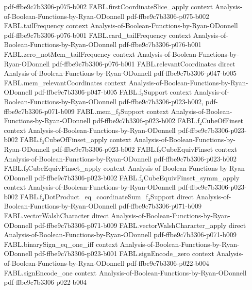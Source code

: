 \begin{theorem}
  {pdf-ffbe9c7b3306-p075-b002}
\proofstep
  {FABL.firstCoordinateSlice_apply}
  {context}
  {Analysis-of-Boolean-Functions-by-Ryan-ODonnell}
  {pdf-ffbe9c7b3306-p075-b002}
\proofstep
  {FABL.tailFrequency}
  {context}
  {Analysis-of-Boolean-Functions-by-Ryan-ODonnell}
  {pdf-ffbe9c7b3306-p076-b001}
\proofstep
  {FABL.card_tailFrequency}
  {context}
  {Analysis-of-Boolean-Functions-by-Ryan-ODonnell}
  {pdf-ffbe9c7b3306-p076-b001}
\proofstep
  {FABL.zero_notMem_tailFrequency}
  {context}
  {Analysis-of-Boolean-Functions-by-Ryan-ODonnell}
  {pdf-ffbe9c7b3306-p076-b001}
\proofstep
  {FABL.relevantCoordinates}
  {direct}
  {Analysis-of-Boolean-Functions-by-Ryan-ODonnell}
  {pdf-ffbe9c7b3306-p047-b005}
\proofstep
  {FABL.mem_relevantCoordinates}
  {context}
  {Analysis-of-Boolean-Functions-by-Ryan-ODonnell}
  {pdf-ffbe9c7b3306-p047-b005}
\proofstep
  {FABL.f₂Support}
  {context}
  {Analysis-of-Boolean-Functions-by-Ryan-ODonnell}
  {pdf-ffbe9c7b3306-p023-b002,
    pdf-ffbe9c7b3306-p071-b009}
\proofstep
  {FABL.mem_f₂Support}
  {context}
  {Analysis-of-Boolean-Functions-by-Ryan-ODonnell}
  {pdf-ffbe9c7b3306-p023-b002}
\proofstep
  {FABL.f₂CubeOfFinset}
  {context}
  {Analysis-of-Boolean-Functions-by-Ryan-ODonnell}
  {pdf-ffbe9c7b3306-p023-b002}
\proofstep
  {FABL.f₂CubeOfFinset_apply}
  {context}
  {Analysis-of-Boolean-Functions-by-Ryan-ODonnell}
  {pdf-ffbe9c7b3306-p023-b002}
\proofstep
  {FABL.f₂CubeEquivFinset}
  {context}
  {Analysis-of-Boolean-Functions-by-Ryan-ODonnell}
  {pdf-ffbe9c7b3306-p023-b002}
\proofstep
  {FABL.f₂CubeEquivFinset_apply}
  {context}
  {Analysis-of-Boolean-Functions-by-Ryan-ODonnell}
  {pdf-ffbe9c7b3306-p023-b002}
\proofstep
  {FABL.f₂CubeEquivFinset_symm_apply}
  {context}
  {Analysis-of-Boolean-Functions-by-Ryan-ODonnell}
  {pdf-ffbe9c7b3306-p023-b002}
\proofstep
  {FABL.f₂DotProduct_eq_coordinateSum_f₂Support}
  {direct}
  {Analysis-of-Boolean-Functions-by-Ryan-ODonnell}
  {pdf-ffbe9c7b3306-p071-b009}
\proofstep
  {FABL.vectorWalshCharacter}
  {direct}
  {Analysis-of-Boolean-Functions-by-Ryan-ODonnell}
  {pdf-ffbe9c7b3306-p071-b009}
\proofstep
  {FABL.vectorWalshCharacter_apply}
  {direct}
  {Analysis-of-Boolean-Functions-by-Ryan-ODonnell}
  {pdf-ffbe9c7b3306-p071-b009}
\proofstep
  {FABL.binarySign_eq_one_iff}
  {context}
  {Analysis-of-Boolean-Functions-by-Ryan-ODonnell}
  {pdf-ffbe9c7b3306-p023-b001}
\proofstep
  {FABL.signEncode_zero}
  {context}
  {Analysis-of-Boolean-Functions-by-Ryan-ODonnell}
  {pdf-ffbe9c7b3306-p022-b004}
\proofstep
  {FABL.signEncode_one}
  {context}
  {Analysis-of-Boolean-Functions-by-Ryan-ODonnell}
  {pdf-ffbe9c7b3306-p022-b004}

\end{theorem}
